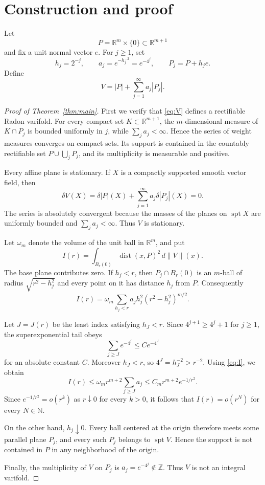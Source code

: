 \documentclass[11pt]{article}
\theoremstyle{remark}
\newcommand{\spt}{\operatorname{spt}}
\begin{document}
\section{Construction and proof}

Let
\[
 P=\mathbb R^m\times\{0\}\subset\mathbb R^{m+1}
\]
and fix a unit normal vector $e$.  For $j\ge1$, set
\[
 h_j=2^{-j},
 \qquad
 a_j=e^{-h_j^{-2}}=e^{-4^j},
 \qquad
 P_j=P+h_je.
\]
Define
\begin{equation}\label{eq:V}
 V=|P|+\sum_{j=1}^{\infty}a_j|P_j|.
\end{equation}

\begin{proof}[Proof of Theorem~\ref{thm:main}]
First we verify that \eqref{eq:V} defines a rectifiable Radon varifold.
For every compact set $K\subset\mathbb R^{m+1}$, the $m$-dimensional
measure of $K\cap P_j$ is bounded uniformly in $j$, while
$\sum_j a_j<\infty$.  Hence the series of weight measures converges on
compact sets.  Its support is contained in the countably rectifiable set
$P\cup\bigcup_jP_j$, and its multiplicity is measurable and positive.

Every affine plane is stationary.  If $X$ is a compactly supported smooth
vector field, then
\[
 \delta V(X)=\delta|P|(X)+\sum_{j=1}^{\infty}a_j\delta|P_j|(X)=0.
\]
The series is absolutely convergent because the masses of the planes on
$\spt X$ are uniformly bounded and $\sum_j a_j<\infty$.  Thus $V$ is
stationary.

Let $\omega_m$ denote the volume of the unit ball in $\mathbb R^m$, and
put
\[
 I(r)=\int_{B_r(0)}\operatorname{dist}(x,P)^2\,d\|V\|(x).
\]
The base plane contributes zero.  If $h_j<r$, then
$P_j\cap B_r(0)$ is an $m$-ball of radius
$\sqrt{r^2-h_j^2}$ and every point on it has distance $h_j$ from $P$.
Consequently
\begin{equation}\label{eq:I}
 I(r)=\omega_m\sum_{h_j<r}
 a_jh_j^2(r^2-h_j^2)^{m/2}.
\end{equation}

Let $J=J(r)$ be the least index satisfying $h_J<r$.  Since
$4^{j+1}\ge4^j+1$ for $j\ge1$, the superexponential tail obeys
\[
 \sum_{j\ge J}e^{-4^j}\le C e^{-4^J}
\]
for an absolute constant $C$.  Moreover $h_J<r$, so
$4^J=h_J^{-2}>r^{-2}$.  Using \eqref{eq:I}, we obtain
\[
 I(r)
 \le \omega_m r^{m+2}\sum_{j\ge J}a_j
 \le C_m r^{m+2}e^{-1/r^2}.
\]
Since $e^{-1/r^2}=o(r^k)$ as $r\downarrow0$ for every $k>0$, it follows
that $I(r)=o(r^N)$ for every $N\in\mathbb N$.

On the other hand, $h_j\downarrow0$.  Every ball centered at the origin
therefore meets some parallel plane $P_j$, and every such $P_j$ belongs to
$\spt V$.  Hence the support is not contained in $P$ in any neighborhood
of the origin.

Finally, the multiplicity of $V$ on $P_j$ is
$a_j=e^{-4^j}\notin\mathbb Z$.  Thus $V$ is not an integral varifold.
\end{proof}
\end{document}
